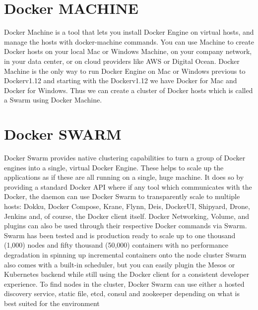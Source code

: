 \documentclass[9pt,twocolumn,twoside]{styles/osajnl}
\begin{document}
\section{Docker MACHINE}

Docker Machine is a tool that lets you install Docker Engine on
virtual hosts, and manage the hosts with docker-machine
commands\cite{www-docker-machine}. You can use Machine to create
Docker hosts on your local Mac or Windows Machine, on your company
network, in your data center, or on cloud providers like AWS or
Digital Ocean. Docker Machine is the only way to run Docker Engine on
Mac or Windows previous to Dockerv1.12 and starting with the
Dockerv1.12 we have Docker for Mac and Docker for Windows. Thus we can
create a cluster of Docker hosts which is called a Swarm using Docker
Machine.

\section{Docker SWARM}
Docker Swarm provides native clustering capabilities to turn a group
of Docker engines into a single, virtual Docker
Engine\cite{www-docker-swarm}. These helps to scale up the
applications as if these are all running on a single, huge machine. It
does so by providing a standard Docker API where if any tool which
communicates with the Docker, the daemon can use Docker Swarm to
transparently scale to multiple hosts: Dokku, Docker Compose, Krane,
Flynn, Deis, DockerUI, Shipyard, Drone, Jenkins and, of course, the
Docker client itself.  Docker Networking, Volume, and plugins can also
be used through their respective Docker commands via Swarm. Swarm has
been tested and is production ready to scale up to one thousand
(1,000) nodes and fifty thousand (50,000) containers with no
performance degradation in spinning up incremental containers onto the
node cluster Swarm also comes with a built-in scheduler, but you can
easily plugin the Mesos or Kubernetes backend while still using the
Docker client for a consistent developer experience. To find nodes in
the cluster, Docker Swarm can use either a hosted discovery service,
static file, etcd, consul and zookeeper depending on what is best
suited for the environment\cite{www-docker-machine}
\end{document}
